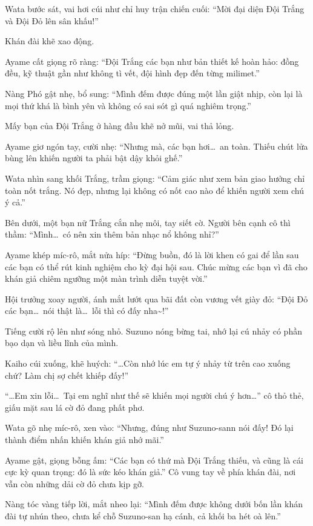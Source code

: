 \documentclass[../main.tex]{subfiles}
\begin{document}
Wata bước sát, vai hơi cúi như chỉ huy trận chiến cuối: ``Mời đại diện Đội Trắng và Đội Đỏ lên sân khấu!''

Khán đài khẽ xao động.

Ayame cất giọng rõ ràng:
``Đội Trắng các bạn như bản thiết kế hoàn hảo: đồng đều, kỹ thuật gần như không tì vết, đội hình đẹp đến từng milimet.''

Nàng Phó gật nhẹ, bổ sung:  ``Mình đếm được đúng một lần giật nhịp, còn lại là mọi thứ khá là bình yên và không có sai sót gì quá nghiêm trọng.''

Mấy bạn của Đội Trắng ở hàng đầu khẽ nở mũi, vai thả lỏng.

Ayame giơ ngón tay, cười nhẹ: ``Nhưng mà, các bạn hơi\dots\ an toàn. Thiếu chút lửa bùng lên khiến người ta phải bật dậy khỏi ghế.''

Wata nhìn sang khối Trắng, trầm giọng: ``Cảm giác như xem bản giao hưởng chỉ toàn nốt trắng. Nó đẹp, nhưng lại không có nốt cao nào để khiến người xem chú ý cả.''

Bên dưới, một bạn nữ Trắng cắn nhẹ môi, tay siết cờ. Người bên cạnh cô thì thầm: ``Mình\dots\ có nên xin thêm bản nhạc nổ không nhỉ?''

Ayame khép míc-rô, mắt nửa híp: ``Đừng buồn, đó là lời khen có gai để lần sau các bạn có thể rút kinh nghiệm cho kỳ đại hội sau. Chúc mừng các bạn vì đã cho khán giả chiêm ngưỡng một màn trình diễn tuyệt vời.''

Hội trưởng xoay người, ánh mắt lướt qua bãi đất còn vương vết giày đỏ: ``Đội Đỏ các bạn\dots\ nói thật là\dots\ lỗi thì có đấy nha\~{}!''

Tiếng cười rộ lên như sóng nhỏ. Suzuno nóng bừng tai, nhớ lại cú nhảy có phần bạo dạn và liều lĩnh của mình.

Kaiho cúi xuống, khẽ huých:  ``\dots Còn nhớ lúc em tự ý nhảy từ trên cao xuống chứ? Làm chị sợ chết khiếp đấy!''

``\dots Em xin lỗi\dots\ Tại em nghĩ như thế sẽ khiến mọi người chú ý hơn\dots'' cô thỏ thẻ, giấu mặt sau lá cờ đỏ đang phất phơ.

Wata gõ nhẹ míc-rô, xen vào: ``Nhưng, đúng như Suzuno-sann nói đấy! Đó lại thành điểm nhấn khiến khán giả nhớ mãi.''

Ayame gật, giọng bỗng ấm: ``Các bạn có thứ mà Đội Trắng thiếu, và cũng là cái cực kỳ quan trọng: đó là sức kéo khán giả.'' Cô vung tay về phía khán đài, nơi vẫn còn những dải cờ đỏ chưa kịp gỡ.

Nàng tóc vàng tiếp lời, mắt nheo lại: ``Mình đếm được không dưới bốn lần khán đài tự nhún theo, chưa kể chỗ Suzuno-san hạ cánh, cả khối ba hét oà lên.''
\end{document}
